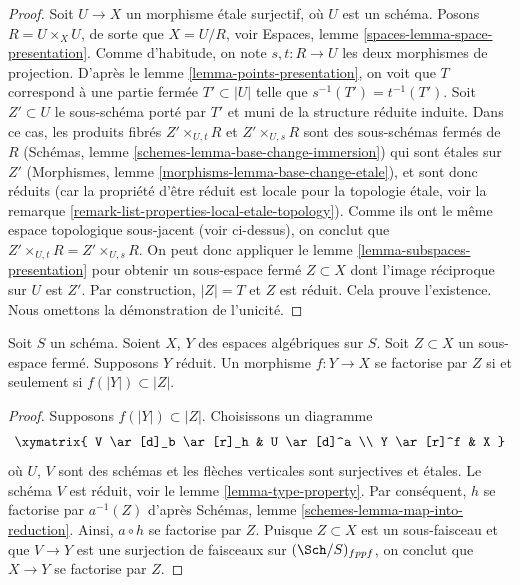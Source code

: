 \begin{proof}
Soit $U \to X$ un morphisme \'etale surjectif, où $U$ est un schéma.
Posons $R = U \times_X U$, de sorte que $X = U/R$, voir
Espaces, lemme \ref{spaces-lemma-space-presentation}.
Comme d'habitude, on note $s, t : R \to U$ les deux morphismes de projection.
D'après le lemme \ref{lemma-points-presentation},
on voit que $T$ correspond à une partie fermée $T' \subset |U|$ telle
que $s^{-1}(T') = t^{-1}(T')$.
Soit $Z' \subset U$ le sous-schéma porté par $T'$ et muni de la structure réduite induite.
Dans ce cas, les produits fibrés
$Z' \times_{U, t} R$ et $Z' \times_{U, s} R$ sont des sous-schémas fermés
de $R$
(Schémas, lemme \ref{schemes-lemma-base-change-immersion})
qui sont \'etales sur $Z'$
(Morphismes, lemme \ref{morphisms-lemma-base-change-etale}),
et sont donc réduits
(car la propriété d'être réduit est locale pour la topologie \'etale, voir la
remarque \ref{remark-list-properties-local-etale-topology}).
Comme ils ont le même espace topologique sous-jacent (voir ci-dessus),
on conclut que $Z' \times_{U, t} R = Z' \times_{U, s} R$.
On peut donc appliquer le lemme \ref{lemma-subspaces-presentation}
pour obtenir un sous-espace fermé $Z \subset X$ dont l'image réciproque sur $U$ est $Z'$.
Par construction, $|Z| = T$ et $Z$ est réduit. Cela prouve l'existence.
Nous omettons la démonstration de l'unicité.
\end{proof}

\begin{lemma}
\label{lemma-map-into-reduction}
Soit $S$ un schéma.
Soient $X$, $Y$ des espaces algébriques sur $S$.
Soit $Z \subset X$ un sous-espace fermé.
Supposons $Y$ réduit.
Un morphisme $f : Y \to X$ se factorise par $Z$ si et seulement si
$f(|Y|) \subset |Z|$.
\end{lemma}

\begin{proof}
Supposons $f(|Y|) \subset |Z|$. Choisissons un diagramme
$$
\xymatrix{
V \ar[d]_b \ar[r]_h & U \ar[d]^a \\
Y \ar[r]^f & X
}
$$
où $U$, $V$ sont des schémas et les flèches verticales sont surjectives et
\'etales. Le schéma $V$ est réduit, voir le
lemme \ref{lemma-type-property}.
Par conséquent, $h$ se factorise par $a^{-1}(Z)$ d'après
Schémas, lemme \ref{schemes-lemma-map-into-reduction}.
Ainsi, $a \circ h$ se factorise par $Z$.
Puisque $Z \subset X$ est un sous-faisceau et que $V \to Y$ est une surjection de faisceaux
sur $(\Sch/S)_{fppf}$, on conclut que $X \to Y$ se factorise
par $Z$.
\end{proof}

